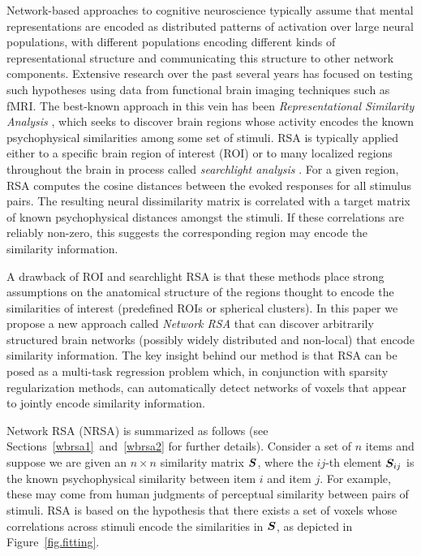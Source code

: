 Network-based approaches to cognitive neuroscience typically assume that mental
representations are encoded as distributed patterns of activation over large neural
populations, with different populations encoding different kinds of representational
structure and communicating this structure to other network components. Extensive research
over the past several years has focused on testing such hypotheses using data from
functional brain imaging techniques such as fMRI. The best-known approach in this vein has
been \emph{Representational Similarity Analysis} \citep[RSA;][]{RSA}, which seeks to discover
brain regions whose activity encodes the known psychophysical similarities among some set
of stimuli. RSA is typically applied either to a specific brain region of interest (ROI)
or to many localized regions throughout the brain in process called {\em searchlight
analysis} \citep{searchlight}. For a given region, RSA computes the cosine distances
between the evoked responses for all stimulus pairs. The resulting neural dissimilarity
matrix is correlated with a target matrix of known psychophysical distances amongst the
stimuli. If these correlations are reliably non-zero, this suggests the corresponding
region may encode the similarity information.

A drawback of ROI and searchlight RSA is that these methods place strong assumptions on
the anatomical structure of the regions thought to encode the similarities of interest
(predefined ROIs or spherical clusters). In this paper we propose a new approach called
{\em Network RSA} that can discover arbitrarily structured brain networks (possibly widely
distributed and non-local) that encode similarity information. The key insight behind our
method is that RSA can be posed as a multi-task regression problem which, in conjunction
with sparsity regularization methods, can automatically detect networks of voxels that
appear to jointly encode similarity information.

Network RSA (NRSA) is summarized as follows (see Sections~\ref{wbrsa1}~and~\ref{wbrsa2}
for further details). Consider a set of $n$ items and suppose we are given an $n \times
n$ similarity matrix $\boldsymbol{S}$, where the $ij$-th element $\boldsymbol{S}_{ij}$ is the known
psychophysical similarity \citep{similarity} between item $i$ and item $j$. For example,
these may come from human judgments of perceptual similarity between pairs of stimuli.
RSA is based on the hypothesis that there exists a set of voxels whose correlations across
stimuli encode the similarities in $\boldsymbol{S}$, as depicted in Figure~\ref{fig.fitting}.

